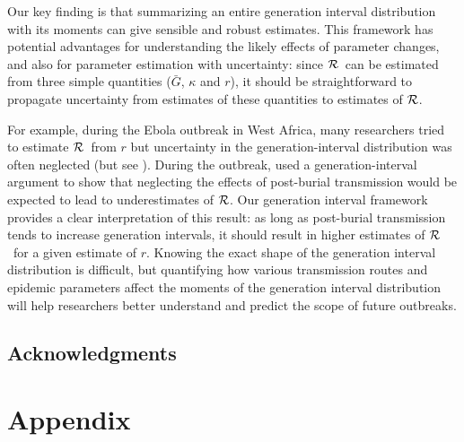 \documentclass[12pt]{article}
\newcommand{\RR}{\ensuremath{{\cal R}}}
\begin{document}
Our key finding is that summarizing an entire generation interval distribution with its moments can give sensible and robust estimates.
This framework has potential advantages for understanding the likely effects of parameter changes, and also for parameter estimation with uncertainty: since \RR\ can be estimated from three simple quantities ($\bar G$, $\kappa$ and $r$), it should be straightforward to propagate uncertainty from estimates of these quantities to estimates of \RR.

For example, during the Ebola outbreak in West Africa, many researchers tried to estimate \RR\ from $r$ \cite{Alth14, AylwBarb14, NishChow15, RiveLofg14, 
KingDome15} but uncertainty in the generation-interval distribution was often neglected (but see \cite{TaylDush16}).  
During the outbreak, \cite{WeitDush15} used a generation-interval argument to  show that neglecting the effects of post-burial transmission would be expected to lead to underestimates of \RR.
Our generation interval framework provides a clear interpretation of this result: as long as post-burial transmission tends to increase generation intervals, it should result in higher estimates of \RR\ for a given estimate of $r$.
Knowing the exact shape of the generation interval distribution is difficult, but quantifying how various transmission routes and epidemic parameters affect the moments of the generation interval distribution will help researchers better understand and predict the scope of future outbreaks.

\subsection*{Acknowledgments}

\printbibliography

\clearpage

\section{Appendix}


\end{document}
